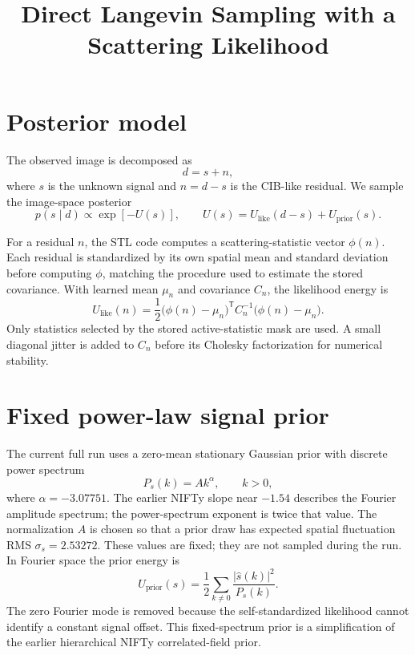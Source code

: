 \documentclass[11pt]{article}
\title{Direct Langevin Sampling with a Scattering Likelihood}
\author{}
\date{}
\begin{document}
\maketitle

\section{Posterior model}

The observed image is decomposed as
\begin{equation}
    d=s+n,
\end{equation}
where $s$ is the unknown signal and $n=d-s$ is the CIB-like residual.  We
sample the image-space posterior
\begin{equation}
    p(s\mid d)\propto \exp[-U(s)],
    \qquad
    U(s)=U_{\mathrm{like}}(d-s)+U_{\mathrm{prior}}(s).
\end{equation}

For a residual $n$, the STL code computes a scattering-statistic vector
$\phi(n)$.  Each residual is standardized by its own spatial mean and
standard deviation before computing $\phi$, matching the procedure used to
estimate the stored covariance.  With learned mean $\mu_n$ and covariance
$C_n$, the likelihood energy is
\begin{equation}
    U_{\mathrm{like}}(n)
    =\frac{1}{2}\bigl(\phi(n)-\mu_n\bigr)^{\mathsf T}
    C_n^{-1}\bigl(\phi(n)-\mu_n\bigr).
\end{equation}
Only statistics selected by the stored active-statistic mask are used.  A
small diagonal jitter is added to $C_n$ before its Cholesky factorization for
numerical stability.

\section{Fixed power-law signal prior}

The current full run uses a zero-mean stationary Gaussian prior with discrete
power spectrum
\begin{equation}
    P_s(k)=A k^{\alpha}, \qquad k>0,
\end{equation}
where $\alpha=-3.07751$.  The earlier NIFTy slope near $-1.54$ describes the
Fourier amplitude spectrum; the power-spectrum exponent is twice that value.
The normalization $A$ is chosen so that a prior draw
has expected spatial fluctuation RMS $\sigma_s=2.53272$.  These values are
fixed; they are not sampled during the run.  In Fourier space the prior energy
is
\begin{equation}
    U_{\mathrm{prior}}(s)
    =\frac{1}{2}\sum_{k\ne0}\frac{|\widehat{s}(k)|^2}{P_s(k)}.
\end{equation}
The zero Fourier mode is removed because the self-standardized likelihood
cannot identify a constant signal offset.  This fixed-spectrum prior is a
simplification of the earlier hierarchical NIFTy correlated-field prior.
\end{document}
